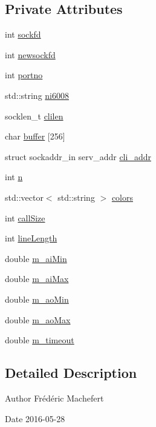 \subsection*{Private Attributes}
\begin{DoxyCompactItemize}
\item 
int \hyperlink{classServer__NI6008_a79b2fe632095d34e1c6320a1ffe2d561}{sockfd}
\item 
int \hyperlink{classServer__NI6008_a37e3d77925f6c6c9d7dee4dc1c8560d6}{newsockfd}
\item 
int \hyperlink{classServer__NI6008_ae70c386215b3945d98eba610022db813}{portno}
\item 
std::string \hyperlink{classServer__NI6008_a9c73f187e64f7d753a8eabd9d1b6e9cd}{ni6008}
\item 
socklen\_\-t \hyperlink{classServer__NI6008_a7870880eba646269208e0c75de3e63bc}{clilen}
\item 
char \hyperlink{classServer__NI6008_a2ebf359e55794c1d5ce59900e90b54e6}{buffer} \mbox{[}256\mbox{]}
\item 
struct sockaddr\_\-in serv\_\-addr \hyperlink{classServer__NI6008_a8f65891da026492eba6d3642df9e0357}{cli\_\-addr}
\item 
int \hyperlink{classServer__NI6008_a5573d5feeef8372e2b31a54d6a5a19aa}{n}
\item 
std::vector$<$ std::string $>$ \hyperlink{classServer__NI6008_a79fecc3f96756f6a519785663bb11d07}{colors}
\item 
int \hyperlink{classServer__NI6008_a9aa5c02fb85f20452a3f8e0f9dcc33fd}{callSize}
\item 
int \hyperlink{classServer__NI6008_a88ff64de4d8715d849b06c2457d13e17}{lineLength}
\item 
double \hyperlink{classServer__NI6008_af0fea276566b46d56f235bece151af78}{m\_\-aiMin}
\item 
double \hyperlink{classServer__NI6008_aa871878e7792bd5dc002f64ef7575dd4}{m\_\-aiMax}
\item 
double \hyperlink{classServer__NI6008_ad650503ceebacea17688e04065130eaa}{m\_\-aoMin}
\item 
double \hyperlink{classServer__NI6008_a228a5d51f43daaf9eaea8e77cfa3334e}{m\_\-aoMax}
\item 
double \hyperlink{classServer__NI6008_a782b89c4483096900a3c02f1b1fc2c2f}{m\_\-timeout}
\end{DoxyCompactItemize}


\subsection{Detailed Description}
\begin{DoxyAuthor}{Author}
Frédéric Machefert 
\end{DoxyAuthor}
\begin{DoxyDate}{Date}
2016-\/05-\/28 
\end{DoxyDate}


